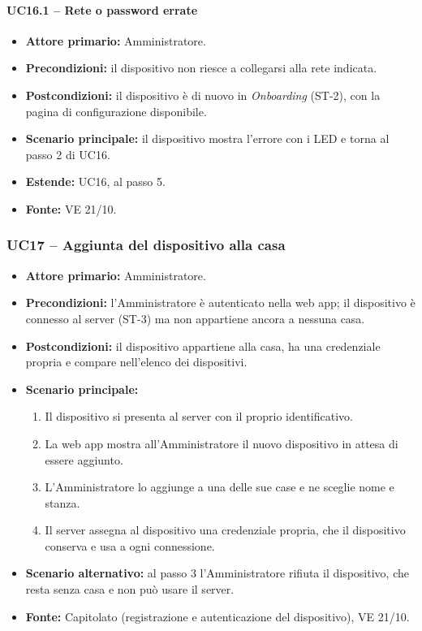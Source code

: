 \documentclass[12pt,a4paper]{article}
\newcommand{\tightlist}{\setlength{\itemsep}{1pt}\setlength{\parskip}{0pt}}
\begin{document}
\paragraph{UC16.1 -- Rete o password errate}
\begin{itemize}
\tightlist
\item \textbf{Attore primario:} Amministratore.
\item \textbf{Precondizioni:} il dispositivo non riesce a collegarsi alla rete indicata.
\item \textbf{Postcondizioni:} il dispositivo è di nuovo in \emph{Onboarding} (ST-2), con la pagina di configurazione disponibile.
\item \textbf{Scenario principale:} il dispositivo mostra l'errore con i LED e torna al passo 2 di UC16.
\item \textbf{Estende:} UC16, al passo 5.
\item \textbf{Fonte:} VE 21/10.
\end{itemize}

\subsubsection{UC17 -- Aggiunta del dispositivo alla casa}
\begin{itemize}
\tightlist
\item \textbf{Attore primario:} Amministratore.
\item \textbf{Precondizioni:} l'Amministratore è autenticato nella web app; il dispositivo è connesso al server (ST-3) ma non appartiene ancora a nessuna casa.
\item \textbf{Postcondizioni:} il dispositivo appartiene alla casa, ha una credenziale propria e compare nell'elenco dei dispositivi.
\item \textbf{Scenario principale:}
\begin{enumerate}
\tightlist
\item Il dispositivo si presenta al server con il proprio identificativo.
\item La web app mostra all'Amministratore il nuovo dispositivo in attesa di essere aggiunto.
\item L'Amministratore lo aggiunge a una delle sue case e ne sceglie nome e stanza.
\item Il server assegna al dispositivo una credenziale propria, che il dispositivo conserva e usa a ogni connessione.
\end{enumerate}
\item \textbf{Scenario alternativo:} al passo 3 l'Amministratore rifiuta il dispositivo, che resta senza casa e non può usare il server.
\item \textbf{Fonte:} Capitolato (registrazione e autenticazione del dispositivo), VE 21/10.
\end{itemize}
\end{document}

